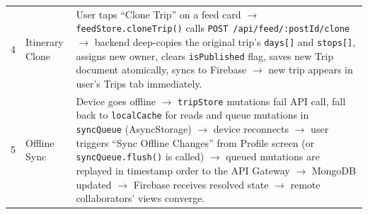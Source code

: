\documentclass[12pt, a4paper]{article}
\begin{document}
\begin{longtable}{C{0.5cm} L{3.0cm} L{10.2cm}}
4 & Itinerary Clone &
User taps ``Clone Trip'' on a feed card $\rightarrow$ \texttt{feedStore.cloneTrip()} calls \texttt{POST /api/feed/:postId/clone} $\rightarrow$ backend deep-copies the original trip's \texttt{days[]} and \texttt{stops[]}, assigns new owner, clears \texttt{isPublished} flag, saves new Trip document atomically, syncs to Firebase $\rightarrow$ new trip appears in user's Trips tab immediately. \\

5 & Offline Sync &
Device goes offline $\rightarrow$ \texttt{tripStore} mutations fail API call, fall back to \texttt{localCache} for reads and queue mutations in \texttt{syncQueue} (AsyncStorage) $\rightarrow$ device reconnects $\rightarrow$ user triggers ``Sync Offline Changes'' from Profile screen (or \texttt{syncQueue.flush()} is called) $\rightarrow$ queued mutations are replayed in timestamp order to the API Gateway $\rightarrow$ MongoDB updated $\rightarrow$ Firebase receives resolved state $\rightarrow$ remote collaborators' views converge. \\

\end{longtable}
\end{document}
